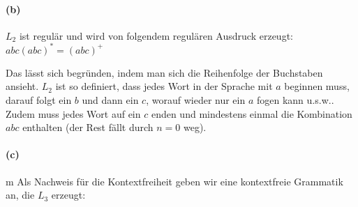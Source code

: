 \paragraph{(b)}
	$L_2$ ist regulär und wird von folgendem regulären Ausdruck erzeugt: $abc(abc)^* = (abc)^+$

	Das lässt sich begründen, indem man sich die Reihenfolge der Buchstaben ansieht. $L_2$ ist so definiert, dass jedes Wort in der Sprache mit $a$ beginnen muss, darauf folgt ein $b$ und dann ein $c$, worauf wieder nur ein $a$ fogen kann u.s.w.. Zudem muss jedes Wort auf ein $c$ enden und mindestens einmal die Kombination $abc$ enthalten (der Rest fällt durch $n=0$ weg).
	
	

	\vspace{0.3cm}

\paragraph{(c)}m
	Als Nachweis für die Kontextfreiheit geben wir eine kontextfreie Grammatik an, die $L_3$ erzeugt:
	
